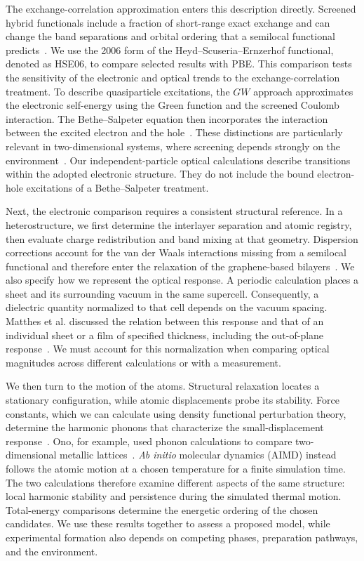 The exchange-correlation approximation enters this description directly.
Screened hybrid functionals include a fraction of short-range exact exchange and can change the band separations and orbital ordering that a semilocal functional predicts~\cite{heyd2003hybrid,krukau2006influence}.
We use the 2006 form of the Heyd--Scuseria--Ernzerhof functional, denoted as HSE06, to compare selected results with PBE.
This comparison tests the sensitivity of the electronic and optical trends to the exchange-correlation treatment.
To describe quasiparticle excitations, the $GW$ approach approximates the electronic self-energy using the Green function and the screened Coulomb interaction.
The Bethe--Salpeter equation then incorporates the interaction between the excited electron and the hole~\cite{onida2002electronic}.
These distinctions are particularly relevant in two-dimensional systems, where screening depends strongly on the environment~\cite{thygesen2017}.
Our independent-particle optical calculations describe transitions within the adopted electronic structure.
They do not include the bound electron-hole excitations of a Bethe--Salpeter treatment.

Next, the electronic comparison requires a consistent structural reference.
In a heterostructure, we first determine the interlayer separation and atomic registry, then evaluate charge redistribution and band mixing at that geometry.
Dispersion corrections account for the van der Waals interactions missing from a semilocal functional and therefore enter the relaxation of the graphene-based bilayers~\cite{grimme2010consistent,grimme2011effect}.
We also specify how we represent the optical response.
A periodic calculation places a sheet and its surrounding vacuum in the same supercell.
Consequently, a dielectric quantity normalized to that cell depends on the vacuum spacing.
Matthes et al. discussed the relation between this response and that of an individual sheet or a film of specified thickness, including the out-of-plane response~\cite{matthes2016influence}.
We must account for this normalization when comparing optical magnitudes across different calculations or with a measurement.

We then turn to the motion of the atoms.
Structural relaxation locates a stationary configuration, while atomic displacements probe its stability.
Force constants, which we can calculate using density functional perturbation theory, determine the harmonic phonons that characterize the small-displacement response~\cite{baroni2001phonons}.
Ono, for example, used phonon calculations to compare two-dimensional metallic lattices~\cite{ono2020dynamical}.
\textit{Ab initio} molecular dynamics (AIMD) instead follows the atomic motion at a chosen temperature for a finite simulation time.
The two calculations therefore examine different aspects of the same structure: local harmonic stability and persistence during the simulated thermal motion.
Total-energy comparisons determine the energetic ordering of the chosen candidates.
We use these results together to assess a proposed model, while experimental formation also depends on competing phases, preparation pathways, and the environment.

